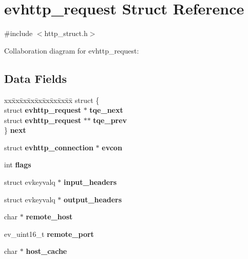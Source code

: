 \section{evhttp\-\_\-request \-Struct \-Reference}
\label{structevhttp__request}


{\ttfamily \#include $<$http\-\_\-struct.\-h$>$}



\-Collaboration diagram for evhttp\-\_\-request\-:
\subsection*{\-Data \-Fields}
\begin{DoxyCompactItemize}
\item 
\begin{tabbing}
xx\=xx\=xx\=xx\=xx\=xx\=xx\=xx\=xx\=\kill
struct \{\\
\>struct {\bf evhttp\_request} $\ast$ {\bfseries tqe\_next}\\
\>struct {\bf evhttp\_request} $\ast$$\ast$ {\bfseries tqe\_prev}\\
\} {\bfseries next}\label{structevhttp__request_aece6a6a39ba9e5536580ab2d778340e9}
\\

\end{tabbing}\item 
struct {\bf evhttp\-\_\-connection} $\ast$ {\bfseries evcon}\label{structevhttp__request_a507c84afa3bb93e17efc8aecd1bf18d2}

\item 
int {\bfseries flags}\label{structevhttp__request_ac8bf36fe0577cba66bccda3a6f7e80a4}

\item 
struct evkeyvalq $\ast$ {\bfseries input\-\_\-headers}\label{structevhttp__request_aede60c2050dad66a8acb668e6dce62da}

\item 
struct evkeyvalq $\ast$ {\bfseries output\-\_\-headers}\label{structevhttp__request_a04d464c0375677d5947d1dea3cf1ffbf}

\item 
char $\ast$ {\bfseries remote\-\_\-host}\label{structevhttp__request_ad3b3b50ad62505bf7cedcbc9a4449a6e}

\item 
ev\-\_\-uint16\-\_\-t {\bfseries remote\-\_\-port}\label{structevhttp__request_a1a0f4454cfb82fd79086a37770aeaaea}

\item 
char $\ast$ {\bfseries host\-\_\-cache}\label{structevhttp__request_a7d0b74418b8de9c36d3168a6dade73a1}


\end{DoxyCompactItemize}
